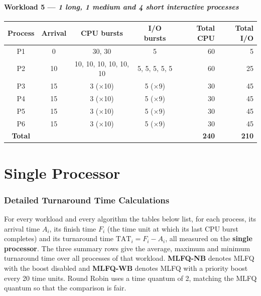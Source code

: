 \documentclass[11pt,a4paper]{article}
\begin{document}
\subsection*{Workload 5 --- \textit{1 long, 1 medium and 4 short interactive processes}}
\begin{center}\small\begin{tabular}{ccccrr}\toprule
Process & Arrival & CPU bursts & I/O bursts & Total CPU & Total I/O \\\midrule
P1 & 0 & 30, 30 & 5 & 60 & 5 \\
P2 & 10 & 10, 10, 10, 10, 10, 10 & 5, 5, 5, 5, 5 & 60 & 25 \\
P3 & 15 & 3 ($\times$10) & 5 ($\times$9) & 30 & 45 \\
P4 & 15 & 3 ($\times$10) & 5 ($\times$9) & 30 & 45 \\
P5 & 15 & 3 ($\times$10) & 5 ($\times$9) & 30 & 45 \\
P6 & 15 & 3 ($\times$10) & 5 ($\times$9) & 30 & 45 \\
\midrule
\textbf{Total} & & & & \textbf{240} & \textbf{210} \\
\bottomrule\end{tabular}\end{center}
\newpage\part{Single Processor}
\section{Detailed Turnaround Time Calculations}

For every workload and every algorithm the tables below list, for each process, its
arrival time $A_i$, its finish time $F_i$ (the time unit at which its last CPU burst
completes) and its turnaround time $\mathrm{TAT}_i = F_i - A_i$, all measured on the
\textbf{single processor}. The three summary rows give the average, maximum and minimum turnaround
time over all processes of that workload. \textbf{MLFQ-NB} denotes MLFQ with the boost
disabled and \textbf{MLFQ-WB} denotes MLFQ with a priority boost every 20 time units.
Round Robin uses a time quantum of 2, matching the MLFQ quantum so that the comparison is
fair.
\end{document}
